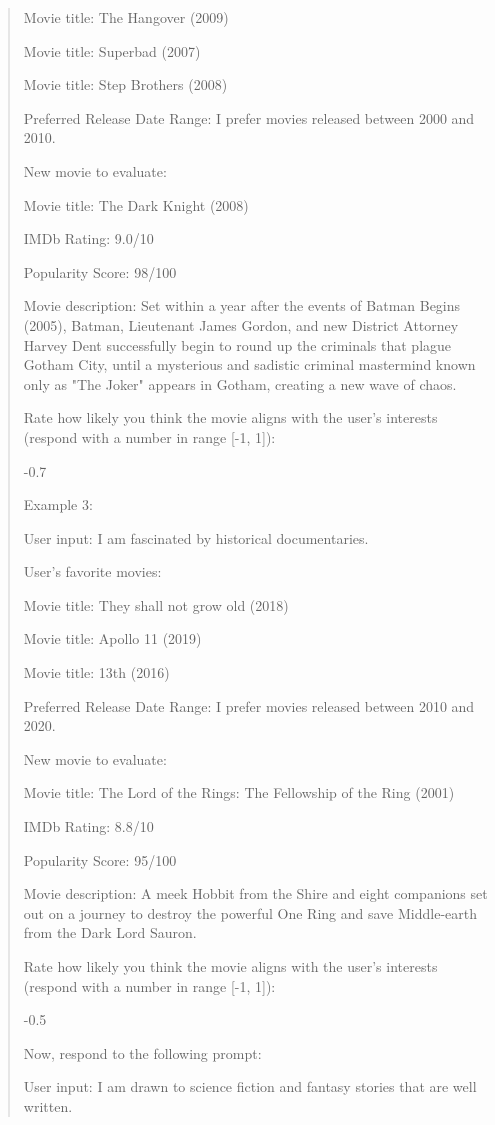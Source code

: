 \documentclass[sigconf]{acmart}
\begin{document}
\begin{figure*}
\begin{mdframed}[linewidth=1pt]
\begin{quote}
Movie title: The Hangover (2009)

Movie title: Superbad (2007)

Movie title: Step Brothers (2008)

Preferred Release Date Range: I prefer movies released between 2000 and 2010.

New movie to evaluate:

Movie title: The Dark Knight (2008)

IMDb Rating: 9.0/10

Popularity Score: 98/100

Movie description: Set within a year after the events of Batman Begins (2005), Batman, Lieutenant James Gordon, and new District Attorney Harvey Dent successfully begin to round up the criminals that plague Gotham City, until a mysterious and sadistic criminal mastermind known only as "The Joker" appears in Gotham, creating a new wave of chaos.

Rate how likely you think the movie aligns with the user's interests (respond with a number in range [-1, 1]):

-0.7

Example 3:

User input: I am fascinated by historical documentaries.

User's favorite movies:

Movie title: They shall not grow old (2018)

Movie title: Apollo 11 (2019)

Movie title: 13th (2016)

Preferred Release Date Range: I prefer movies released between 2010 and 2020.

New movie to evaluate:

Movie title: The Lord of the Rings: The Fellowship of the Ring (2001)

IMDb Rating: 8.8/10

Popularity Score: 95/100

Movie description: A meek Hobbit from the Shire and eight companions set out on a journey to destroy the powerful One Ring and save Middle-earth from the Dark Lord Sauron.

Rate how likely you think the movie aligns with the user's interests (respond with a number in range [-1, 1]):

-0.5

Now, respond to the following prompt:

User input: I am drawn to science fiction and fantasy stories that are well written.


\end{quote}
\end{mdframed}
\end{figure*}
\end{document}

